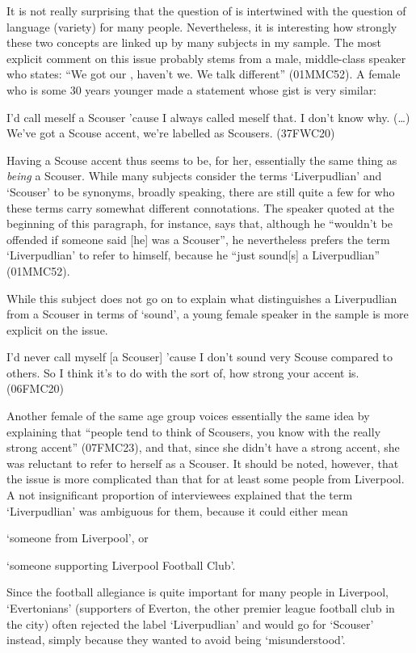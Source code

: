 It is not really surprising that the question of  is intertwined with the question of language (variety) for many people.
Nevertheless, it is interesting how strongly these two concepts are linked up by many subjects in my sample.
The most explicit comment on this issue probably stems from a male, middle-class speaker who states: ``We got our , haven't we. We talk different'' (01MMC52).
A female who is some 30 years younger made a statement whose gist is very similar:
\begin{example}
	I'd call meself a Scouser 'cause I always called meself that. I don't know why. (\ldots) We've got a Scouse accent, we're labelled as Scousers. (37FWC20)
\end{example}
Having a Scouse accent thus seems to be, for her, essentially the same thing as \emph{being} a Scouser.
While many subjects consider the terms `Liverpudlian' and `Scouser' to be synonyms, broadly speaking, there are still quite a few for who these terms carry somewhat different connotations.
The speaker quoted at the beginning of this paragraph, for instance, says that, although he ``wouldn't be offended if someone said [he] was a Scouser'', he nevertheless prefers the term `Liverpudlian' to refer to himself, because he ``just sound[s] a Liverpudlian'' (01MMC52).

While this subject does not go on to explain what distinguishes a Liverpudlian from a Scouser in terms of `sound', a young female speaker in the sample is more explicit on the issue.
\begin{example}
	I'd never call myself [a Scouser] 'cause I don't sound very Scouse compared to others. So I think it's to do with the sort of, how strong your accent is. (06FMC20)
\end{example}
Another female of the same age group voices essentially the same idea by explaining that ``people tend to think of Scousers, you know with the really strong accent'' (07FMC23), and that, since she didn't have a strong accent, she was reluctant to refer to herself as a Scouser.
It should be noted, however, that the issue is more complicated than that for at least some people from Liverpool.
A not insignificant proportion of interviewees explained that the term `Liverpudlian' was ambiguous for them, because it could either mean
\begin{inparaenum}[(1)]
	\item `someone from Liverpool', or
	\item `someone supporting Liverpool Football Club'.
\end{inparaenum}
Since the football allegiance is quite important for many people in Liverpool, `Evertonians' (supporters of Everton, the other premier league football club in the city) often rejected the label `Liverpudlian' and would go for `Scouser' instead, simply because they wanted to avoid being `misunderstood'.

